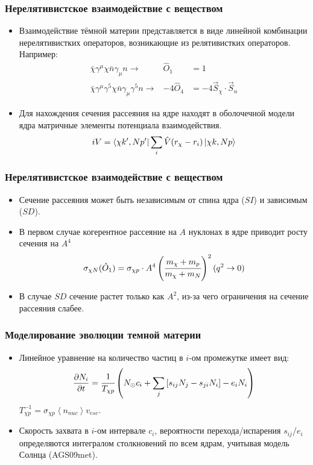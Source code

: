 \documentclass[
11pt,]{beamer}
\newcommand{\deriv}[2]{\frac{\partial #1}{\partial #2}}
\newcommand{\avarage}[1]{\left\langle #1 \right\rangle}
\begin{document}
	\begin{frame}
		\frametitle{Нерелятивистское взаимодействие с веществом}
		\begin{itemize}
	\item Взаимодействие тёмной материи представляется в виде линейной комбинации нерелятивистких операторов, возникающие из релятивистких операторов. Например:
	\begin{eqnarray*}
		\bar{\chi}\gamma^{\mu}\chi \bar{n}\gamma_{\mu}n \rightarrow& \hat{O}_1 &= 1 \\
		\bar{\chi}\gamma^{\mu}\gamma^{5}\chi \bar{n}\gamma_{\mu}\gamma^{5}n \rightarrow& -4\hat{O}_4  &= -4 \vec{S}_{\chi}\cdot\vec{S}_{n}
	\end{eqnarray*}
	\item Для нахождения сечения рассеяния на ядре находят в оболочечной модели ядра матричные элементы 
	потенциала взаимодействия.
	\begin{equation*}
		iV = \bra{\chi k',N p'} \sum_i{\hat{V}(r_{\chi} - r_{i})} \ket{\chi k,N p}
	\end{equation*}
\end{itemize}
	\end{frame}
	
	\begin{frame}
		\frametitle{Нерелятивистское взаимодействие с веществом}
		\begin{itemize}
	\item Сечение рассеяния может быть независимым от спина ядра ($SI$) и зависимым ($SD$). 
	\item В первом случае когерентное рассеяние на $A$ нуклонах в ядре приводит росту сечения на $A^4$
	\begin{equation*}
		\sigma_{\chi N}(\hat{O}_1) = \sigma_{\chi p}\cdot A^4 \left(\cfrac{m_{\chi}+m_{p}}{m_{\chi} + m_{N}}\right)^2 (q^2 \rightarrow 0)
	\end{equation*}
	\item В случае $SD$ сечение растет только как $A^2$, из-за чего ограничения на сечение рассеяния слабее.
\end{itemize}
	\end{frame}
	
	\begin{frame}
		\frametitle{Моделирование эволюции темной материи}
		\begin{itemize}
	\item Линейное уравнение на количество частиц в $i$-ом промежутке имеет вид:
	\begin{equation*}
		\deriv{N_{i}}{t} = \cfrac{1}{T_{\chi p}} \left(N_{\odot} c_i +
		\sum_j{[s_{ij} N_{j} - s_{ji} N_{i} ]} - e_{i} N_i  \right)
	\end{equation*}
	$T_{\chi p}^{-1} = \sigma_{\chi p} \avarage{n_{nuc}} v_{esc}$.
	\item Скорость захвата в $i$-ом интервале $c_i$, вероятности перехода/испарения $s_{ij}$/$e_{i}$ определяются интегралом столкновений по всем ядрам, учитывая модель Солнца (AGS09met).
\end{itemize}
	\end{frame}
	
\end{document}
